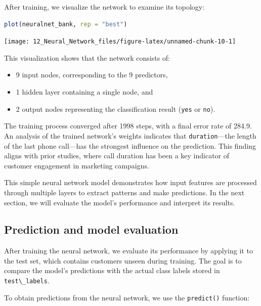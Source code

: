 \documentclass[
  11pt,
]{book}
\newcommand{\passthrough}[1]{#1}
\providecommand{\tightlist}{%
  \setlength{\itemsep}{0pt}\setlength{\parskip}{0pt}}
\theoremstyle{definition}
\theoremstyle{definition}
\theoremstyle{definition}
\theoremstyle{definition}
\theoremstyle{remark}
\begin{document}
After training, we visualize the network to examine its topology:

\begin{lstlisting}[language=R]
plot(neuralnet_bank, rep = "best")
\end{lstlisting}

\begin{center}\texttt{[image: 12\_Neural\_Network\_files/figure-latex/unnamed-chunk-10-1]} \end{center}

This visualization shows that the network consists of:

\begin{itemize}
\tightlist
\item
  9 input nodes, corresponding to the 9 predictors,\\
\item
  1 hidden layer containing a single node, and\\
\item
  2 output nodes representing the classification result (\passthrough{\lstinline!yes!} or \passthrough{\lstinline!no!}).
\end{itemize}

The training process converged after 1998 steps, with a final error rate of 284.9. An analysis of the trained network's weights indicates that \passthrough{\lstinline!duration!}---the length of the last phone call---has the strongest influence on the prediction. This finding aligns with prior studies, where call duration has been a key indicator of customer engagement in marketing campaigns.

This simple neural network model demonstrates how input features are processed through multiple layers to extract patterns and make predictions. In the next section, we will evaluate the model's performance and interpret its results.

\subsection*{Prediction and model evaluation}\label{prediction-and-model-evaluation-2}


After training the neural network, we evaluate its performance by applying it to the test set, which contains customers unseen during training. The goal is to compare the model's predictions with the actual class labels stored in \passthrough{\lstinline!test\_labels!}.

To obtain predictions from the neural network, we use the \passthrough{\lstinline!predict()!} function:
\end{document}
